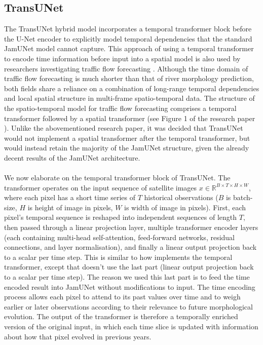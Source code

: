 \documentclass[10pt,oneside,a4paper,english]{article}
\begin{document}
\subsection{TransUNet}
The TransUNet hybrid model incorporates a temporal transformer block before the U-Net encoder to explicitly model temporal dependencies that the standard JamUNet model cannot capture. This approach of using a temporal transformer to encode time information before input into a spatial model is also used by researchers investigating traffic flow forecasting \cite{ma2024spatial}. Although the time domain of traffic flow forecasting is much shorter than that of river morphology prediction, both fields share a reliance on a combination of long-range temporal dependencies and local spatial structure in multi-frame spatio-temporal data. The structure of the spatio-temporal model for traffic flow forecasting \cite{ma2024spatial} comprises a temporal transformer followed by a spatial transformer (see Figure 1 of the research paper \cite{ma2024spatial}). Unlike the abovementioned research paper, it was decided that TransUNet would not implement a spatial transformer after the temporal transformer, but would instead retain the majority of the JamUNet structure, given the already decent results of the JamUNet architecture. \\
\\
We now elaborate on the temporal transformer block of TransUNet. The transformer operates on the input sequence of satellite images $x \in \mathbb{R}^{B \times T \times H \times W}$, where each pixel has a short time series of $T$ historical observations ($B$ is batch-size, $H$ is height of image in pixels, $W$ is width of image in pixels). First, each pixel’s temporal sequence is reshaped into independent sequences of length $T$, then passed through a linear projection layer, multiple transformer encoder layers (each containing multi-head self-attention, feed-forward networks, residual connections, and layer normalisation), and finally a linear output projection back to a scalar per time step. This is similar to how \cite{ma2024spatial} implements the temporal transformer, except that \cite{ma2024spatial} doesn't use the last part (linear output projection back to a scalar per time step). The reason we used this last part is to feed the time encoded result into JamUNet without modifications to input. The time encoding process allows each pixel to attend to its past values over time and to weigh earlier or later observations according to their relevance to future morphological evolution. The output of the transformer is therefore a temporally enriched version of the original input, in which each time slice is updated with information about how that pixel evolved in previous years. \\
\end{document}
